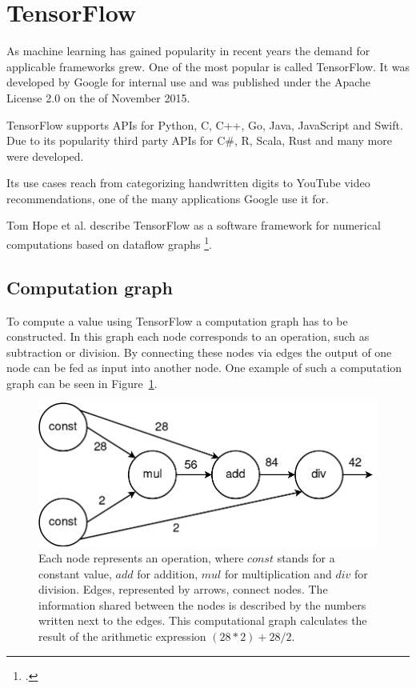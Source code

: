\section{TensorFlow}
As machine learning has gained popularity in recent years the demand for applicable frameworks grew. One of the most popular is called TensorFlow. It was developed by Google for internal use and was published under the Apache License 2.0 on the  of November 2015.

TensorFlow supports APIs for Python, C, C++, Go, Java, JavaScript and Swift.
Due to its popularity third party APIs for C\#, R, Scala, Rust and many more were developed.

Its use cases reach from categorizing handwritten digits to YouTube video recommendations, one of the many applications Google use it for.

Tom Hope et al. describe TensorFlow as a software framework for numerical computations based on dataflow graphs \footcite[page 6]{Hope_Learning_TensorFlow}.

\subsection{Computation graph}
To compute a value using TensorFlow a computation graph has to be constructed. In this graph each node corresponds to an operation, such as subtraction or division. By connecting these nodes via edges the output of one node can be fed as input into another node. One example of such a computation graph can be seen in Figure~\ref{pic:implementation_tensorflow_nodesAndGraphs_computationGraph}.

\begin{figure}[h!]
	\centering
	\includegraphics[width=4.5in]{img/implementation_tensorflow_nodesAndGraphs_computationGraph.png}
	\caption{Each node represents an operation, where $const$ stands for a constant value, $add$ for addition, $mul$ for multiplication and $div$ for division. Edges, represented by arrows, connect nodes. The information shared between the nodes is described by the numbers written next to the edges. This computational graph calculates the result of the arithmetic expression $(28 * 2) + 28 / 2$.}
	\label{pic:implementation_tensorflow_nodesAndGraphs_computationGraph}
\end{figure}

